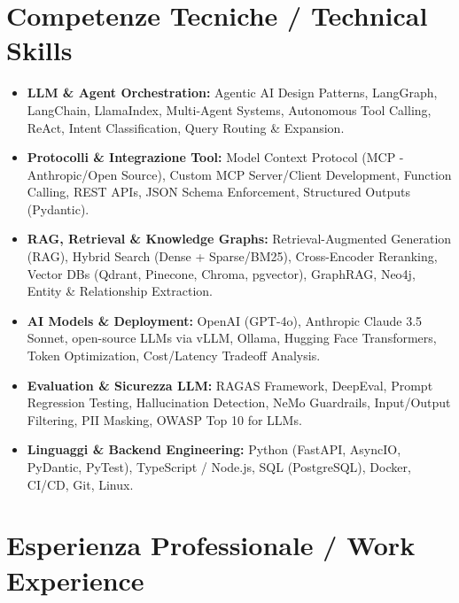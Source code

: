 \documentclass[a4paper,10pt]{article}
\begin{document}
\section{Competenze Tecniche / Technical Skills}
\begin{itemize}[leftmargin=1.2em, itemsep=2pt]
  \item \textbf{LLM \& Agent Orchestration:} Agentic AI Design Patterns, LangGraph, LangChain, LlamaIndex, Multi-Agent Systems, Autonomous Tool Calling, ReAct, Intent Classification, Query Routing \& Expansion.
  \item \textbf{Protocolli \& Integrazione Tool:} Model Context Protocol (MCP - Anthropic/Open Source), Custom MCP Server/Client Development, Function Calling, REST APIs, JSON Schema Enforcement, Structured Outputs (Pydantic).
  \item \textbf{RAG, Retrieval \& Knowledge Graphs:} Retrieval-Augmented Generation (RAG), Hybrid Search (Dense + Sparse/BM25), Cross-Encoder Reranking, Vector DBs (Qdrant, Pinecone, Chroma, pgvector), GraphRAG, Neo4j, Entity \& Relationship Extraction.
  \item \textbf{AI Models \& Deployment:} OpenAI (GPT-4o), Anthropic Claude 3.5 Sonnet, open-source LLMs via vLLM, Ollama, Hugging Face Transformers, Token Optimization, Cost/Latency Tradeoff Analysis.
  \item \textbf{Evaluation \& Sicurezza LLM:} RAGAS Framework, DeepEval, Prompt Regression Testing, Hallucination Detection, NeMo Guardrails, Input/Output Filtering, PII Masking, OWASP Top 10 for LLMs.
  \item \textbf{Linguaggi \& Backend Engineering:} Python (FastAPI, AsyncIO, PyDantic, PyTest), TypeScript / Node.js, SQL (PostgreSQL), Docker, CI/CD, Git, Linux.
\end{itemize}

\section{Esperienza Professionale / Work Experience}
\end{document}
